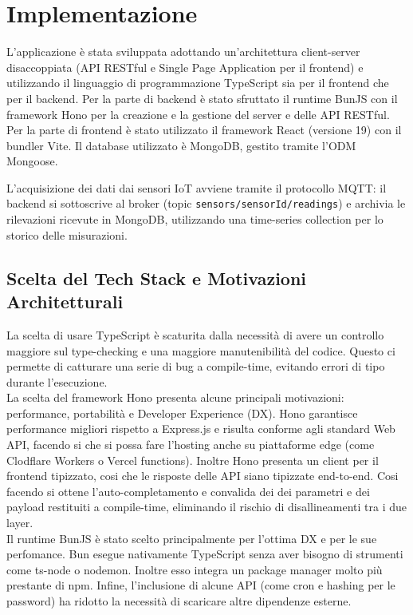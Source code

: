 \section{Implementazione}
\label{chap:implementation}

L'applicazione è stata sviluppata adottando un'architettura client-server disaccoppiata (API RESTful e Single Page Application per il frontend) e utilizzando il linguaggio di programmazione
TypeScript sia per il frontend che per il backend. 
Per la parte di backend è stato sfruttato il
runtime BunJS con il framework Hono
per la creazione e la gestione del server e delle API
RESTful. Per la parte di frontend è stato utilizzato il
framework React (versione 19) con il bundler
Vite. Il database utilizzato è MongoDB,
gestito tramite l'ODM Mongoose.

L'acquisizione dei dati dai sensori IoT avviene tramite il
protocollo MQTT: il backend si sottoscrive al broker (topic \texttt{sensors/{sensorId}/readings}) e archivia le
rilevazioni ricevute in MongoDB, utilizzando una time-series
collection per lo storico delle misurazioni.

\subsection{Scelta del Tech Stack e Motivazioni Architetturali}
La scelta di usare TypeScript è scaturita dalla necessità di avere
un controllo maggiore sul type-checking e una maggiore manutenibilità
del codice.
Questo ci permette di catturare una serie di bug a compile-time, evitando errori di tipo durante l'esecuzione.\\

La scelta del framework Hono presenta alcune principali motivazioni: performance, portabilità e Developer Experience (DX).
Hono garantisce performance migliori rispetto a Express.js e risulta conforme agli standard Web API, facendo si che si possa fare l'hosting anche su piattaforme edge (come Clodflare Workers o Vercel functions).
Inoltre Hono presenta un client per il frontend tipizzato, cosi che le risposte delle API siano tipizzate end-to-end. Cosi facendo si ottene l'auto-completamento e convalida dei dei parametri e dei payload restituiti a compile-time, eliminando il rischio di disallineamenti tra i due layer.\\

Il runtime BunJS è stato scelto principalmente per l'ottima DX e per le sue perfomance. Bun esegue nativamente TypeScript senza aver bisogno di strumenti come ts-node o nodemon. Inoltre esso integra un package manager molto più prestante di npm.
Infine, l'inclusione di alcune API (come cron e hashing per le password) ha  ridotto la necessità di scaricare altre dipendenze esterne.\\

